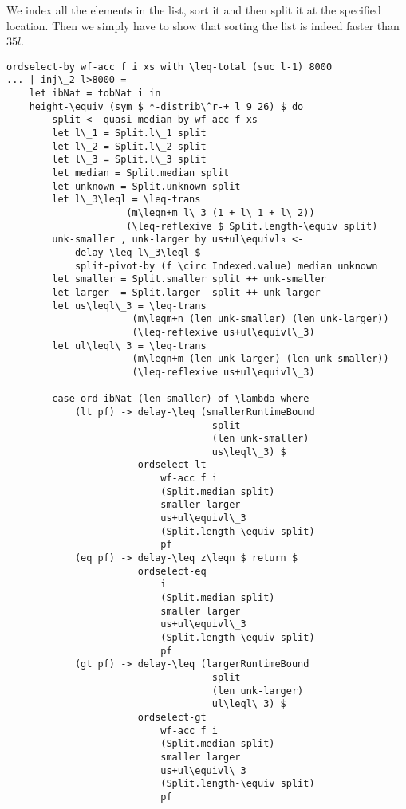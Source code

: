 We index all the elements in the list, sort it and then split it at the specified location. Then we simply have to show that sorting the list is indeed faster than $35l$.

\begin{lstlisting}[caption={Quickselect ($l > 8000$)},label={lst:median:quickselect:large},emph={ordselect,by}]
ordselect-by wf-acc f i xs with \leq-total (suc l-1) 8000
... | inj\_2 l>8000 =
    let ibNat = tobNat i in
    height-\equiv (sym $ *-distrib\^r-+ l 9 26) $ do
        split <- quasi-median-by wf-acc f xs
        let l\_1 = Split.l\_1 split
        let l\_2 = Split.l\_2 split
        let l\_3 = Split.l\_3 split
        let median = Split.median split
        let unknown = Split.unknown split
        let l\_3\leql = \leq-trans
                     (m\leqn+m l\_3 (1 + l\_1 + l\_2))
                     (\leq-reflexive $ Split.length-\equiv split)
        unk-smaller , unk-larger by us+ul\equivl₃ <-
            delay-\leq l\_3\leql $
            split-pivot-by (f \circ Indexed.value) median unknown
        let smaller = Split.smaller split ++ unk-smaller
        let larger  = Split.larger  split ++ unk-larger
        let us\leql\_3 = \leq-trans
                      (m\leqm+n (len unk-smaller) (len unk-larger))
                      (\leq-reflexive us+ul\equivl\_3)
        let ul\leql\_3 = \leq-trans
                      (m\leqn+m (len unk-larger) (len unk-smaller))
                      (\leq-reflexive us+ul\equivl\_3)

        case ord ibNat (len smaller) of \lambda where
            (lt pf) -> delay-\leq (smallerRuntimeBound
                                    split
                                    (len unk-smaller)
                                    us\leql\_3) $
                       ordselect-lt
                           wf-acc f i
                           (Split.median split)
                           smaller larger
                           us+ul\equivl\_3
                           (Split.length-\equiv split)
                           pf
            (eq pf) -> delay-\leq z\leqn $ return $
                       ordselect-eq
                           i
                           (Split.median split)
                           smaller larger
                           us+ul\equivl\_3
                           (Split.length-\equiv split)
                           pf
            (gt pf) -> delay-\leq (largerRuntimeBound
                                    split
                                    (len unk-larger)
                                    ul\leql\_3) $
                       ordselect-gt
                           wf-acc f i
                           (Split.median split)
                           smaller larger
                           us+ul\equivl\_3
                           (Split.length-\equiv split)
                           pf
\end{lstlisting}


